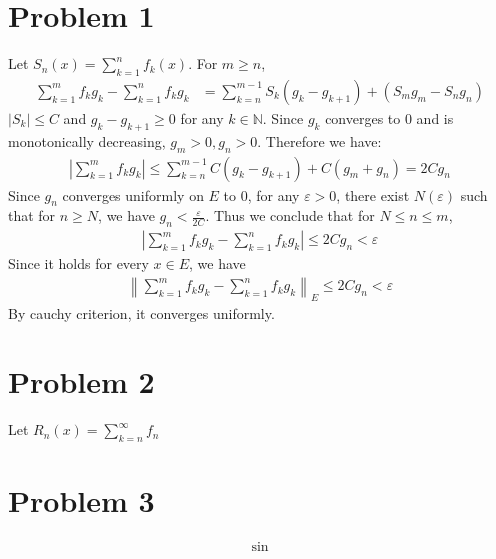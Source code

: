 \documentclass{report}
\def\ve{\varepsilon}
\begin{document}
    \section*{Problem 1}
    Let $S_n(x) = \sum_{k=1}^n f_k(x)$. For $m \ge n$,
    \begin{align*}
        \sum_{k=1}^m f_k g_k - \sum_{k=1}^n f_k g_k &= \sum_{k=n}^{m-1}S_k(g_k-g_{k+1})
            + (S_m g_m - S_n g_n) 
    \end{align*}
    $|S_k| \le C$ and $g_k - g_{k+1} \ge 0$ for any $k \in \mathbb{N}$. 
    Since $g_k$ converges to 0 and is monotonically decreasing, $g_m > 0, g_n > 0$. 
    Therefore we have:
    \begin{align*}
        \left| \sum_{k=1}^m f_k g_k\right| \le \sum_{k=n}^{m-1} C (g_k-g_{k+1}) + 
            C(g_m + g_n) = 2Cg_n
    \end{align*}
    Since $g_n$ converges uniformly on $E$ to 0, for any $\varepsilon > 0$, there 
    exist $N(\varepsilon)$ such that for $n \ge N$, we have $g_n<\frac{\varepsilon}{2C}$.
    Thus we conclude that for $N \le n \le m$, 
    \begin{align*}
        \left| \sum_{k=1}^m f_k g_k - \sum_{k=1}^n f_k g_k\right| \le 2Cg_n < \varepsilon
    \end{align*}
    Since it holds for every $x \in E$, we have 
    \begin{align*}
        \left\| \sum_{k=1}^m f_k g_k-\sum_{k=1}^n f_k g_k \right\|_E \le 2Cg_n < \ve
    \end{align*}
    By cauchy criterion, it converges uniformly.
    
    \section*{Problem 2}
    Let $R_n(x) = \sum_{k=n}^\infty f_n$
    \section*{Problem 3}
    \begin{align*}
        \sin 
    \end{align*}
\end{document}
